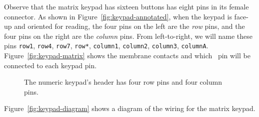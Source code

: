 
Observe that the matrix keypad has sixteen buttons has eight pins in its female connector.
As shown in Figure~\ref{fig:keypad-annotated}, when the keypad is face-up and oriented for reading, the four pins on the left are the \textit{row} pins, and the four pins on the right are the \textit{column} pins.
From left-to-right, we will name these pins \texttt{row1}, \texttt{row4}, \texttt{row7}, \texttt{row*}, \texttt{column1}, \texttt{column2}, \texttt{column3}, \texttt{columnA}.
Figure~\ref{fig:keypad-matrix} shows the membrane contacts and which \developmentboard\ pin will be connected to each keypad pin.


\begin{figure}
    \centering
    \hfil
    \caption{The numeric keypad's header has four row pins and four column pins.}
\end{figure}

Figure~\ref{fig:keypad-diagram} shows a diagram of the wiring for the matrix keypad.

